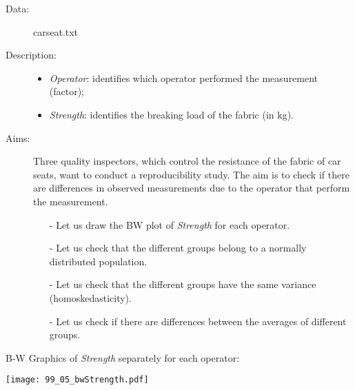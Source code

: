 

\begin{frame}
  \begin{description}
    \item[Data: ]carseat.txt \\ 
    \item[Description: ]
      \begin{footnotesize}
        \begin{itemize}
          \item \textit{Operator}: identifies which operator performed the measurement (factor);
          \item \textit{Strength}: identifies the breaking load of the fabric (in kg).
        \end{itemize}
      \end{footnotesize}
    \item[Aims: ]
      \begin{footnotesize}
        Three quality inspectors, which control the resistance of the fabric of car seats, want to conduct a reproducibility study. The aim is to check if there are differences in observed measurements due to the operator that perform the measurement.   
        \begin{itemize}
          \item[-] Let us draw the BW plot of \textit{Strength} for each operator.
          \item[-] Let us check that the different groups belong to a normally distributed population.
          \item[-] Let us check that the different groups have the same variance (homoskedasticity).
          \item[-] Let us check if there are differences between the averages of different groups.
        \end{itemize}
      \end{footnotesize}
  \end{description}
\end{frame}

\begin{frame}
  B-W Graphics of \textit{Strength} separately for each operator:\\
  \begin{center}
    \texttt{[image: 99\_05\_bwStrength.pdf]}
  \end{center}
\end{frame}

